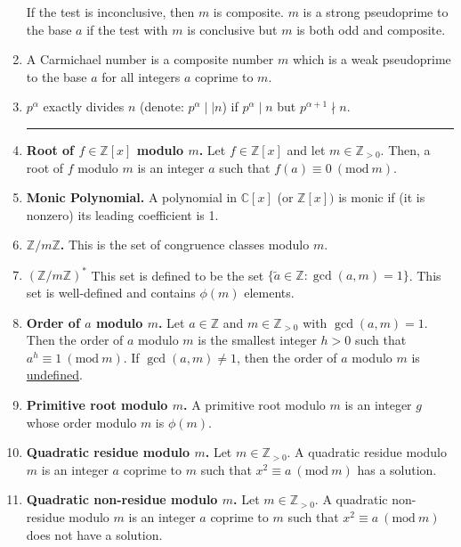\documentclass[12pt]{article}
\theoremstyle{definition}
\theoremstyle{named}
\newcommand{\Mod}[1]{\ (\mathrm{mod}\ #1)}
\begin{document}
\begin{enumerate}
\begin{enumerate}
        \end{enumerate}
    If the test is inconclusive, then $m$ is composite. $m$ is a strong pseudoprime to the base $a$ if the test with $m$ is conclusive but $m$ is both odd and composite. 
    \item A Carmichael number is a composite number $m$ which is a weak pseudoprime to the base $a$ for all integers $a$ coprime to $m$. 
    \item $p^\alpha$ exactly divides $n$ (denote: $p^\alpha \mid\mid n$) if $p^\alpha \mid n$ but $p^{\alpha + 1} \nmid n$. \\
    \begin{center}
        \hrule
    \end{center}
    \item \textbf{Root of $f \in \mathbb{Z}[x]$ modulo $m$. } Let $f \in \mathbb{Z}[x]$ and let $m \in \mathbb{Z}_{>0}$. Then, a root of $f$ modulo $m$ is an integer $a$ such that $f(a) \equiv 0 \Mod{m}$. 
    \item \textbf{Monic Polynomial. } A polynomial in $\mathbb{C}[x]$ (or $\mathbb{Z}[x])$ is monic if (it is nonzero) its leading coefficient is 1. 
    \item \textbf{$\mathbb{Z}/m\mathbb{Z}$. } This is the set of congruence classes modulo $m$. 
    \item \textbf{$\left(\mathbb{Z}/m\mathbb{Z}\right)^\ast$} This set is defined to be the set $\{\tilde{a} \in \mathbb{Z} : \gcd(a,m) = 1\}$. This set is well-defined and contains $\phi(m)$ elements. 
    \item \textbf{Order of $a$ modulo $m$. } Let $a \in \mathbb{Z}$ and $m \in \mathbb{Z}_{>0}$ with $\gcd(a,m) = 1$. Then the order of $a$ modulo $m$ is the smallest integer $h > 0$ such that $a^h \equiv 1 \Mod{m}$. If $\gcd(a,m) \neq 1$, then the order of $a$ modulo $m$ is \underline{undefined}. 
    \item \textbf{Primitive root modulo $m$. } A primitive root modulo $m$ is an integer $g$ whose order modulo $m$ is $\phi(m)$. 
    \item \textbf{Quadratic residue modulo $m$. } Let $m \in \mathbb{Z}_{>0}$. A quadratic residue modulo $m$ is an integer $a$ coprime to $m$ such that $x^2 \equiv a \Mod{m}$ has a solution. 
    \item \textbf{Quadratic non-residue modulo $m$. } Let $m \in \mathbb{Z}_{>0}$. A quadratic non-residue modulo $m$ is an integer $a$ coprime to $m$ such that $x^2 \equiv a \Mod{m}$ does not have a solution. 

\end{enumerate}
\end{document}

